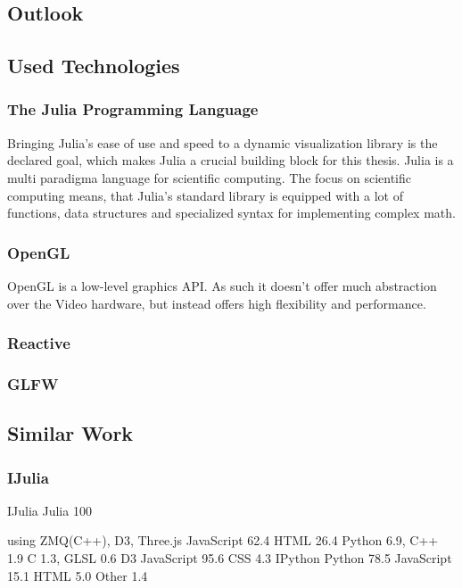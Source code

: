 \subsection{Outlook}

\subsection{Used Technologies}


\subsubsection{The Julia Programming Language}
Bringing Julia's ease of use and speed to a dynamic visualization library is the declared goal, which makes Julia a crucial building block for this thesis.
Julia is a multi paradigma language for scientific computing.
The focus on scientific computing means, that Julia's standard library is equipped with a lot of functions, data structures and specialized syntax for implementing complex math.


\subsubsection{OpenGL}
OpenGL is a low-level graphics API. As such it doesn't offer much abstraction over the Video hardware, but instead offers high flexibility and performance.


\subsubsection{Reactive}
\subsubsection{GLFW}


\subsection{Similar Work}

\subsubsection{IJulia}
IJulia
Julia 100

using ZMQ(C++), D3, 
Three.js
JavaScript 62.4	 HTML 26.4	 Python 6.9,	 C++ 1.9	 C 1.3,	 GLSL 0.6
D3
JavaScript 95.6	 CSS 4.3
IPython
Python 78.5	 JavaScript 15.1	 HTML 5.0	 Other 1.4


